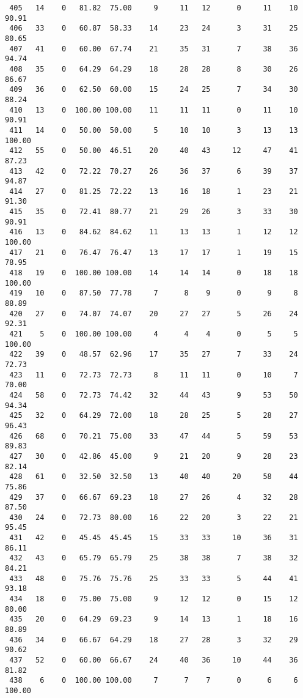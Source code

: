\begin{verbatim}
 405   14    0   81.82  75.00     9     11   12      0     11    10    90.91
 406   33    0   60.87  58.33    14     23   24      3     31    25    80.65
 407   41    0   60.00  67.74    21     35   31      7     38    36    94.74
 408   35    0   64.29  64.29    18     28   28      8     30    26    86.67
 409   36    0   62.50  60.00    15     24   25      7     34    30    88.24
 410   13    0  100.00 100.00    11     11   11      0     11    10    90.91
 411   14    0   50.00  50.00     5     10   10      3     13    13   100.00
 412   55    0   50.00  46.51    20     40   43     12     47    41    87.23
 413   42    0   72.22  70.27    26     36   37      6     39    37    94.87
 414   27    0   81.25  72.22    13     16   18      1     23    21    91.30
 415   35    0   72.41  80.77    21     29   26      3     33    30    90.91
 416   13    0   84.62  84.62    11     13   13      1     12    12   100.00
 417   21    0   76.47  76.47    13     17   17      1     19    15    78.95
 418   19    0  100.00 100.00    14     14   14      0     18    18   100.00
 419   10    0   87.50  77.78     7      8    9      0      9     8    88.89
 420   27    0   74.07  74.07    20     27   27      5     26    24    92.31
 421    5    0  100.00 100.00     4      4    4      0      5     5   100.00
 422   39    0   48.57  62.96    17     35   27      7     33    24    72.73
 423   11    0   72.73  72.73     8     11   11      0     10     7    70.00
 424   58    0   72.73  74.42    32     44   43      9     53    50    94.34
 425   32    0   64.29  72.00    18     28   25      5     28    27    96.43
 426   68    0   70.21  75.00    33     47   44      5     59    53    89.83
 427   30    0   42.86  45.00     9     21   20      9     28    23    82.14
 428   61    0   32.50  32.50    13     40   40     20     58    44    75.86
 429   37    0   66.67  69.23    18     27   26      4     32    28    87.50
 430   24    0   72.73  80.00    16     22   20      3     22    21    95.45
 431   42    0   45.45  45.45    15     33   33     10     36    31    86.11
 432   43    0   65.79  65.79    25     38   38      7     38    32    84.21
 433   48    0   75.76  75.76    25     33   33      5     44    41    93.18
 434   18    0   75.00  75.00     9     12   12      0     15    12    80.00
 435   20    0   64.29  69.23     9     14   13      1     18    16    88.89
 436   34    0   66.67  64.29    18     27   28      3     32    29    90.62
 437   52    0   60.00  66.67    24     40   36     10     44    36    81.82
 438    6    0  100.00 100.00     7      7    7      0      6     6   100.00

\end{verbatim}
